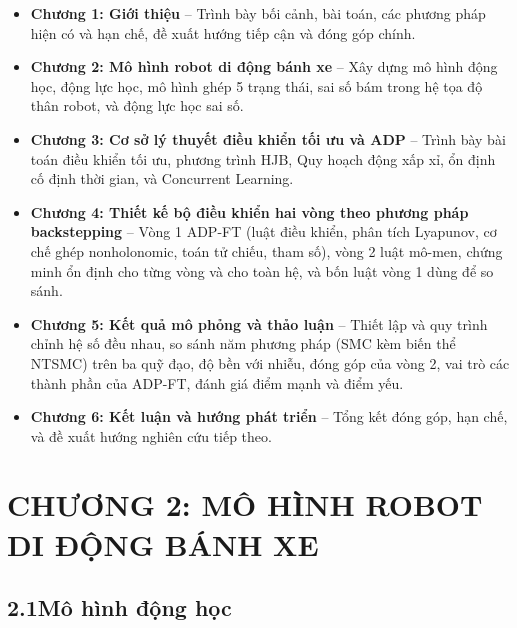 \documentclass[12pt,a4paper]{article}
\newcommand{\chapternum}{0}
\newcommand{\setchapter}[1]{%
  \renewcommand{\chapternum}{#1}%
  \setcounter{figure}{0}%
  \setcounter{table}{0}%
  \setcounter{equation}{0}%
  \renewcommand{\thefigure}{\chapternum.\arabic{figure}}%
  \renewcommand{\thetable}{\chapternum.\arabic{table}}%
  \renewcommand{\theequation}{\chapternum.\arabic{equation}}%
  \renewcommand{\theHfigure}{\chapternum.\arabic{figure}}%
  \renewcommand{\theHtable}{\chapternum.\arabic{table}}%
  \renewcommand{\theHequation}{\chapternum.\arabic{equation}}%
  \setcounter{dinhly}{0}\setcounter{bode}{0}\setcounter{hequa}{0}%
  \def\theHdinhly{\chapternum.\arabic{dinhly}}%
  \def\theHbode{\chapternum.\arabic{bode}}%
  \def\theHhequa{\chapternum.\arabic{hequa}}%
}
\begin{document}
\begin{itemize}[nosep]
    \item \textbf{Chương 1: Giới thiệu} -- Trình bày bối cảnh, bài toán, các phương pháp hiện có và hạn chế, đề xuất hướng tiếp cận và đóng góp chính.

    \item \textbf{Chương 2: Mô hình robot di động bánh xe} -- Xây dựng mô hình động học, động lực học, mô hình ghép 5 trạng thái, sai số bám trong hệ tọa độ thân robot, và động lực học sai số.

    \item \textbf{Chương 3: Cơ sở lý thuyết điều khiển tối ưu và ADP} -- Trình bày bài toán điều khiển tối ưu, phương trình HJB, Quy hoạch động xấp xỉ, ổn định cố định thời gian, và Concurrent Learning.

    \item \textbf{Chương 4: Thiết kế bộ điều khiển hai vòng theo phương pháp backstepping} -- Vòng 1 ADP-FT (luật điều khiển, phân tích Lyapunov, cơ chế ghép nonholonomic, toán tử chiếu, tham số), vòng 2 luật mô-men, chứng minh ổn định cho từng vòng và cho toàn hệ, và bốn luật vòng 1 dùng để so sánh.

    \item \textbf{Chương 5: Kết quả mô phỏng và thảo luận} -- Thiết lập và quy trình chỉnh hệ số đều nhau, so sánh năm phương pháp (SMC kèm biến thể NTSMC) trên ba quỹ đạo, độ bền với nhiễu, đóng góp của vòng 2, vai trò các thành phần của ADP-FT, đánh giá điểm mạnh và điểm yếu.

    \item \textbf{Chương 6: Kết luận và hướng phát triển} -- Tổng kết đóng góp, hạn chế, và đề xuất hướng nghiên cứu tiếp theo.
\end{itemize}


\newpage
\setchapter{2}
\section*{CHƯƠNG 2: MÔ HÌNH ROBOT DI ĐỘNG BÁNH XE}

\subsection*{2.1\quad Mô hình động học}
\end{document}
